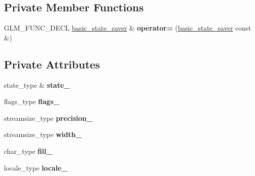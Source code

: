 \subsection*{Private Member Functions}
\begin{DoxyCompactItemize}
\item 
\mbox{\label{classglm_1_1io_1_1basic__state__saver_add3605cf6a261400ca499be074baa4db}} 
G\+L\+M\+\_\+\+F\+U\+N\+C\+\_\+\+D\+E\+CL \hyperlink{classglm_1_1io_1_1basic__state__saver}{basic\+\_\+state\+\_\+saver} \& {\bfseries operator=} (\hyperlink{classglm_1_1io_1_1basic__state__saver}{basic\+\_\+state\+\_\+saver} const \&)
\end{DoxyCompactItemize}
\subsection*{Private Attributes}
\begin{DoxyCompactItemize}
\item 
\mbox{\label{classglm_1_1io_1_1basic__state__saver_a969e854089f2df42ee0050d38cc70903}} 
state\+\_\+type \& {\bfseries state\+\_\+}
\item 
\mbox{\label{classglm_1_1io_1_1basic__state__saver_a2017c6e006a9e5c0c1ee191aee59c835}} 
flags\+\_\+type {\bfseries flags\+\_\+}
\item 
\mbox{\label{classglm_1_1io_1_1basic__state__saver_a1b442206b28b324603599175285fb55a}} 
streamsize\+\_\+type {\bfseries precision\+\_\+}
\item 
\mbox{\label{classglm_1_1io_1_1basic__state__saver_a7c2f48c587295d3717b0b6790f78034d}} 
streamsize\+\_\+type {\bfseries width\+\_\+}
\item 
\mbox{\label{classglm_1_1io_1_1basic__state__saver_abf8166290d087051954306facad38e00}} 
char\+\_\+type {\bfseries fill\+\_\+}
\item 
\mbox{\label{classglm_1_1io_1_1basic__state__saver_a108385f01212b427ebae048eaf181e0d}} 
locale\+\_\+type {\bfseries locale\+\_\+}
\end{DoxyCompactItemize}


